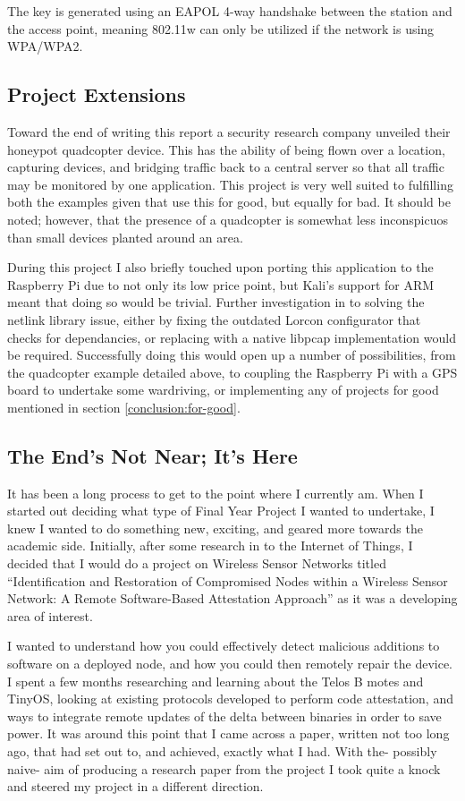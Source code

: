 The key is generated using an EAPOL 4-way handshake between the station and the access point, meaning 802.11w can only be utilized if the network is using WPA/WPA2.

\subsection{Project Extensions}

Toward the end of writing this report a security research company unveiled their honeypot quadcopter device. This has the ability of being flown over a location, capturing devices, and bridging traffic back to a central server so that all traffic may be monitored by one application. This project is very well suited to fulfilling both the examples given that use this for good, but equally for bad. It should be noted; however, that the presence of a quadcopter is somewhat less inconspicuos than small devices planted around an area. 

During this project I also briefly touched upon porting this application to the Raspberry Pi due to not only its low price point, but Kali's support for ARM meant that doing so would be trivial. Further investigation in to solving the netlink library issue, either by fixing the outdated Lorcon configurator that checks for dependancies, or replacing with a native libpcap implementation would be required. Successfully doing this would open up a number of possibilities, from the quadcopter example detailed above, to coupling the Raspberry Pi with a GPS board to undertake some wardriving, or implementing any of projects for good mentioned in section \ref{conclusion:for-good}.
\newpage
\subsection{The End's Not Near; It's Here}
It has been a long process to get to the point where I currently am. When I started out deciding what type of Final Year Project I wanted to undertake, I knew I wanted to do something new, exciting, and geared more towards the academic side. Initially, after some research in to the Internet of Things, I decided that I would do a project on Wireless Sensor Networks titled ``Identification and Restoration of Compromised Nodes within a Wireless Sensor Network: A Remote Software-Based Attestation Approach'' as it was a developing area of interest. 

I wanted to understand how you could effectively detect malicious additions to software on a deployed node, and how you could then remotely repair the device. I spent a few months researching and learning about the Telos B motes and TinyOS, looking at existing protocols developed to perform code attestation, and ways to integrate remote updates of the delta between binaries in order to save power. It was around this point that I came across a paper, written not too long ago, that had set out to, and achieved, exactly what I had. With the- possibly naive- aim of producing a research paper from the project I took quite a knock and steered my project in a different direction.

